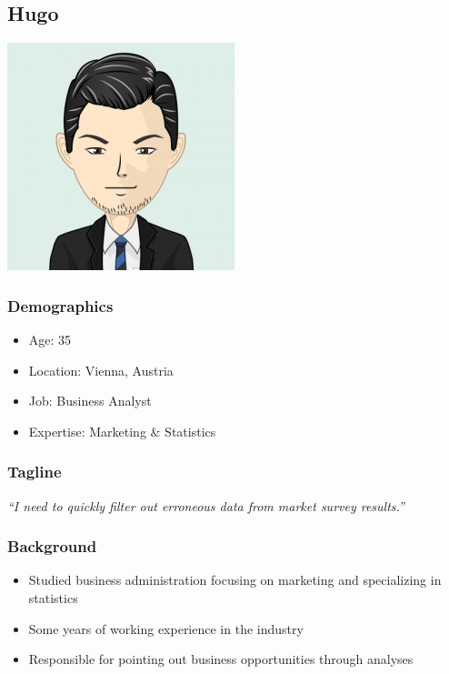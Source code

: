 \subsection{Hugo}

\includegraphics[scale=0.5]{figures/requirements/persona-avatar-hugo}

\subsubsection{Demographics}

\begin{itemize}
    \item Age: 35
    \item Location: Vienna, Austria
    \item Job: Business Analyst
    \item Expertise: Marketing \& Statistics
\end{itemize}

\subsubsection{Tagline}

\textit{``I need to quickly filter out erroneous data from market survey results.''}

\subsubsection{Background}

\begin{itemize}
    \item Studied business administration focusing on marketing and specializing in statistics
    \item Some years of working experience in the industry
    \item Responsible for pointing out business opportunities through analyses
\end{itemize}

